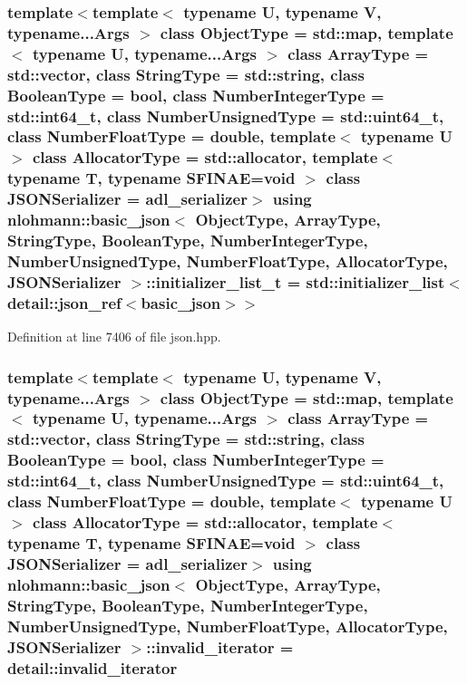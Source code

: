 \subsubsection[{\texorpdfstring{initializer\+\_\+list\+\_\+t}{initializer_list_t}}]{\setlength{\rightskip}{0pt plus 5cm}template$<$template$<$ typename U, typename V, typename...\+Args $>$ class Object\+Type = std\+::map, template$<$ typename U, typename...\+Args $>$ class Array\+Type = std\+::vector, class String\+Type  = std\+::string, class Boolean\+Type  = bool, class Number\+Integer\+Type  = std\+::int64\+\_\+t, class Number\+Unsigned\+Type  = std\+::uint64\+\_\+t, class Number\+Float\+Type  = double, template$<$ typename U $>$ class Allocator\+Type = std\+::allocator, template$<$ typename T, typename S\+F\+I\+N\+A\+E=void $>$ class J\+S\+O\+N\+Serializer = adl\+\_\+serializer$>$ using {\bf nlohmann\+::basic\+\_\+json}$<$ Object\+Type, Array\+Type, String\+Type, Boolean\+Type, Number\+Integer\+Type, Number\+Unsigned\+Type, Number\+Float\+Type, Allocator\+Type, J\+S\+O\+N\+Serializer $>$\+::{\bf initializer\+\_\+list\+\_\+t} =  std\+::initializer\+\_\+list$<${\bf detail\+::json\+\_\+ref}$<${\bf basic\+\_\+json}$>$$>$}\hypertarget{classnlohmann_1_1basic__json_a670f6a0eb3d1e0ffd00c27d35472ccc9}{}\label{classnlohmann_1_1basic__json_a670f6a0eb3d1e0ffd00c27d35472ccc9}


Definition at line 7406 of file json.\+hpp.

\subsubsection[{\texorpdfstring{invalid\+\_\+iterator}{invalid_iterator}}]{\setlength{\rightskip}{0pt plus 5cm}template$<$template$<$ typename U, typename V, typename...\+Args $>$ class Object\+Type = std\+::map, template$<$ typename U, typename...\+Args $>$ class Array\+Type = std\+::vector, class String\+Type  = std\+::string, class Boolean\+Type  = bool, class Number\+Integer\+Type  = std\+::int64\+\_\+t, class Number\+Unsigned\+Type  = std\+::uint64\+\_\+t, class Number\+Float\+Type  = double, template$<$ typename U $>$ class Allocator\+Type = std\+::allocator, template$<$ typename T, typename S\+F\+I\+N\+A\+E=void $>$ class J\+S\+O\+N\+Serializer = adl\+\_\+serializer$>$ using {\bf nlohmann\+::basic\+\_\+json}$<$ Object\+Type, Array\+Type, String\+Type, Boolean\+Type, Number\+Integer\+Type, Number\+Unsigned\+Type, Number\+Float\+Type, Allocator\+Type, J\+S\+O\+N\+Serializer $>$\+::{\bf invalid\+\_\+iterator} =  {\bf detail\+::invalid\+\_\+iterator}}\hypertarget{classnlohmann_1_1basic__json_ac13d32f7cbd02d616e71d8dc30dadcbf}{}\label{classnlohmann_1_1basic__json_ac13d32f7cbd02d616e71d8dc30dadcbf}


